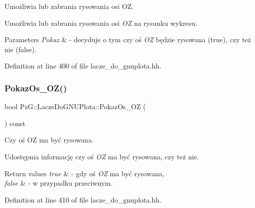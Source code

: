 Umożliwia lub zabrania rysowania osi OZ. 

Umożliwia lub zabrania rysowania osi {\itshape OZ} na rysunku wykresu. 
\begin{DoxyParams}{Parameters}
{\em Pokaz} & -\/ decyduje o tym czy oś {\itshape OZ} będzie rysowana ({\ttfamily true}), czy też nie ({\ttfamily false}). \\
\hline
\end{DoxyParams}


Definition at line 400 of file lacze\+\_\+do\+\_\+gnuplota.\+hh.

\mbox{\label{class_pz_g_1_1_lacze_do_g_n_u_plota_a22c708af33c57bf3b5d1b4e82b4017b7}} 
\subsubsection{\texorpdfstring{Pokaz\+Os\+\_\+\+O\+Z()}{PokazOs\_OZ()}\hspace{0.1cm}{\footnotesize\ttfamily [2/2]}}
{\footnotesize\ttfamily bool Pz\+G\+::\+Lacze\+Do\+G\+N\+U\+Plota\+::\+Pokaz\+Os\+\_\+\+OZ (\begin{DoxyParamCaption}{ }\end{DoxyParamCaption}) const\hspace{0.3cm}{\ttfamily [inline]}}



Czy oś OZ ma być rysowana. 

Udostępnia informację czy oś {\itshape OZ} ma być rysowana, czy też nie. 
\begin{DoxyRetVals}{Return values}
{\em true} & -\/ gdy oś {\itshape OZ} ma być rysowana, \\
\hline
{\em false} & -\/ w przypadku przeciwnym. \\
\hline
\end{DoxyRetVals}


Definition at line 410 of file lacze\+\_\+do\+\_\+gnuplota.\+hh.

\mbox{\label{class_pz_g_1_1_lacze_do_g_n_u_plota_a5063854b7232a7951d120a21df63f2b7}} 
